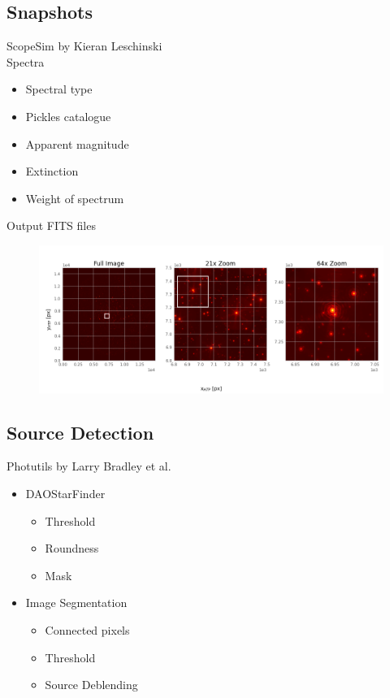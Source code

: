 \documentclass{beamer}
\begin{document}
\subsection{Snapshots}

\begin{frame}

ScopeSim by Kieran Leschinski
\\[2ex]
Spectra
\begin{itemize}
\item Spectral type
\item Pickles catalogue
\item Apparent magnitude
\item Extinction
\item Weight of spectrum
\end{itemize}
\vspace{\baselineskip}
Output FITS files
\end{frame}

\begin{frame}
\begin{figure}
\centering
\includegraphics[width=\textwidth]{Images/fits_snapshot.png}
\end{figure}
\end{frame}

\subsection{Source Detection}

\begin{frame}
Photutils by Larry Bradley et al.
\\[2ex]
\begin{itemize}
\item<1-> DAOStarFinder
	\begin{itemize}
	\item Threshold
	\item Roundness
	\item Mask
	\end{itemize}

\item<2-> Image Segmentation
	\begin{itemize}
	\item Connected pixels 
	\item Threshold
	\item Source Deblending
	\end{itemize}
\end{itemize}

\end{frame}
\end{document}
